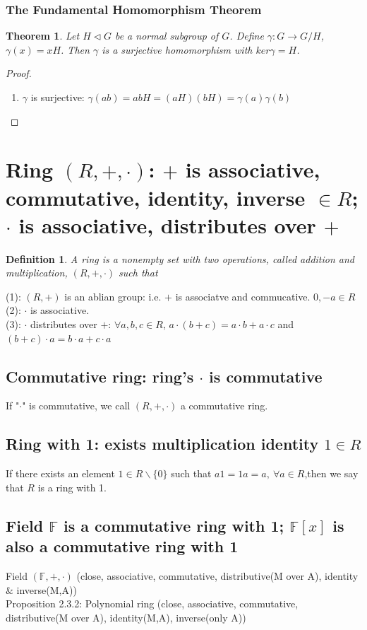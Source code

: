 \documentclass[11pt,a4paper]{article}
\newtheorem{theorem}{Theorem}
\newtheorem{definition}{Definition}
\begin{document}
\subsubsection{The Fundamental Homomorphism Theorem}
\begin{theorem}
Let $H \lhd G$ be a normal subgroup of $G$. Define $\gamma: G \rightarrow G/H$, $\gamma(x)=xH$. Then $\gamma$ is a surjective homomorphism with $ker \gamma=H$.
\end{theorem}
\begin{proof}
\quad\\
\begin{enumerate}
    \item $\gamma$ is surjective: $\gamma(ab)=abH=(aH)(bH)=\gamma(a)\gamma(b)$
\end{enumerate}
\end{proof}






\section{Ring $(R,+,\cdot)$: $+$ is associative, commutative, identity, inverse $\in R$; $\cdot$ is associative, distributes over $+$}
\begin{definition}
    A ring is a nonempty set with two operations, called addition and multiplication, $(R,+,\cdot)$ such that
\end{definition}
(1): $(R,+)$ is an ablian group: i.e. $+$ is associatve and commucative. $0,-a\in R$\\
(2): $\cdot$ is associative.\\
(3): $\cdot$ distributes over $+$: $\forall a,b,c\in R$, $a\cdot(b+c)=a\cdot b+a\cdot c$ and $(b+c)\cdot a=b\cdot a+c\cdot a$
\subsection{Commutative ring: ring's $\cdot$ is commutative}
If "$\cdot$" is commutative, we call $(R, +, \cdot)$ a commutative ring.
\subsection{Ring with 1: exists multiplication identity $1\in R$}
If there exists an element $1\in R\backslash \{0\}$ such that $a1=1a=a,\ \forall a\in R$,then we say that $R$ is a ring with 1.

\subsection{Field $\mathbb{F}$ is a commutative ring with 1; $\mathbb{F}[x]$ is also a commutative ring with 1}
Field $(\mathbb{F}, +, \cdot)$ (close, associative, commutative, distributive(M over A), identity $\&$ inverse(M,A))\\
Proposition 2.3.2: Polynomial ring (close, associative, commutative, distributive(M over A), identity(M,A), inverse(only A))
\end{document}
